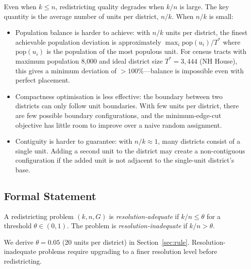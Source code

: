 Even when $k \leq n$, redistricting quality degrades when $k/n$ is large.
The key quantity is the average number of units per district, $n/k$.
When $n/k$ is small:
\begin{itemize}
  \item Population balance is harder to achieve: with $n/k$ units per district,
    the finest achievable population deviation is approximately
    $\max_i \text{pop}(u_i) / T^*$ where $\text{pop}(u_i)$ is the population
    of the most populous unit. For census tracts with maximum population 8,000
    and ideal district size $T^* = 3,444$ (NH House), this gives a minimum
    deviation of $>100\%$---balance is impossible even with perfect placement.
  \item Compactness optimisation is less effective: the boundary between two
    districts can only follow unit boundaries. With few units per district,
    there are few possible boundary configurations, and the minimum-edge-cut
    objective has little room to improve over a naive random assignment.
  \item Contiguity is harder to guarantee: with $n/k \approx 1$, many districts
    consist of a single unit. Adding a second unit to the district may create
    a non-contiguous configuration if the added unit is not adjacent to the
    single-unit district's base.
\end{itemize}

\subsection{Formal Statement}
\label{sec:problem:formal}

\begin{definition}
  A redistricting problem $(k, n, G)$ is \emph{resolution-adequate} if
  $k/n \leq \theta$ for a threshold $\theta \in (0,1)$. The problem is
  \emph{resolution-inadequate} if $k/n > \theta$.
\end{definition}

We derive $\theta = 0.05$ (20 units per district) in Section~\ref{sec:rule}.
Resolution-inadequate problems require upgrading to a finer resolution level
before redistricting.

